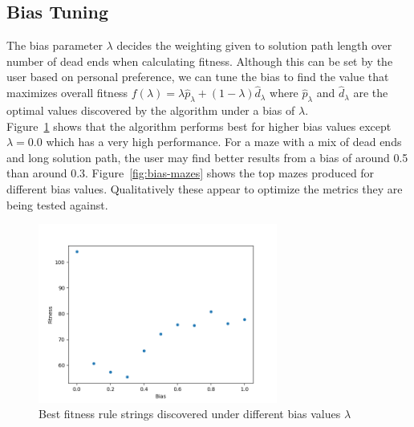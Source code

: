 \subsection{Bias Tuning}
The bias parameter $\lambda$ decides the weighting given to solution path length over number of dead ends when calculating fitness. Although this can be set by the user based on personal preference, we can tune the bias to find the value that maximizes overall fitness  $f(\lambda) = \lambda \hat{p}_\lambda + (1-\lambda)\hat{d}_\lambda$ where $ \hat{p}_\lambda$ and $\hat{d}_\lambda$ are the optimal values discovered by the algorithm under a bias of $\lambda$.\\ 

Figure~\ref{fig:bias-tuning} shows that the algorithm performs best for higher bias values except $\lambda=0.0$ which has a very high performance. For a maze with a mix of dead ends and long solution path, the user may find better results from a bias of around 0.5 than around 0.3. Figure~\ref{fig:bias-mazes} shows the top mazes produced for different bias values. Qualitatively these appear to optimize the metrics they are being tested against.

\begin{figure}[!h]
\centering
\includegraphics[width=0.7\textwidth]{images/bias-tuning.png}
\caption{Best fitness rule strings discovered under different bias values $\lambda$}
\label{fig:bias-tuning}
\end{figure}

